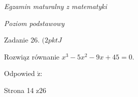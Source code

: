 \documentclass[a4paper,12pt]{article}
\begin{document}
{\it Egzamin maturalny z matematyki}

{\it Poziom podstawowy}

Zadanie 26. $(2pktJ$

Rozwiąz równanie $x^{3}-5x^{2}-9x+45=0.$

Odpowied $\acute{\mathrm{z}}$:

Strona 14 $\mathrm{z}26$
\end{document}

